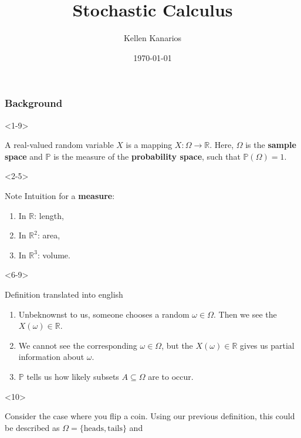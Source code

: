 \documentclass[10pt]{beamer}
\title{Stochastic Calculus}
\author{Kellen Kanarios}
\institute{University of Michigan}
\date{\today}
\begin{document}
\begin{frame}
\titlepage
\end{frame}

\begin{frame}[t]
  \frametitle{Background}
  \begin{onlyenv}<1-9>
    \begin{definition}
      A real-valued random variable $X$ is a mapping $X : \Omega \to \mathbb{R}$. Here, $\Omega$ is the \textbf{sample space} and $\mathbb{P}$ is the measure of the \textbf{probability space}, such that $\mathbb{P}(\Omega) = 1$.
    \end{definition}
  \end{onlyenv}
  \begin{onlyenv}<2-5>
      \begin{block}{Note}
        Intuition for a \textbf{measure}:
        \begin{enumerate}
          \item <3-> In $\mathbb{R}$: length,
          \item <4-> In $\mathbb{R}^2$: area,
          \item <5-> In $\mathbb{R}^3$: volume.
        \end{enumerate}
      \end{block}
  \end{onlyenv}
  \begin{onlyenv}<6-9>
      \begin{block}{Definition translated into english}
        \begin{enumerate}
          \item<7->
            Unbeknownst to us, someone chooses a random $\omega \in \Omega$. Then we see the $X(\omega) \in \mathbb{R}$.
          \item<8->
            We cannot see the corresponding $\omega \in \Omega$, but the $X(\omega) \in \mathbb{R}$ gives us partial information about $\omega$.
          \item<9-> $\mathbb{P}$ tells us how likely subsets $A \subseteq \Omega$ are to occur.
        \end{enumerate}
      \end{block}
  \end{onlyenv}
  \begin{onlyenv}<10>
    \begin{example}
      Consider the case where you flip a coin. Using our previous definition, this could be described as $\Omega = \{\text{heads}, \text{tails}\}$ and \\

\end{example}
\end{onlyenv}
\end{frame}
\end{document}
